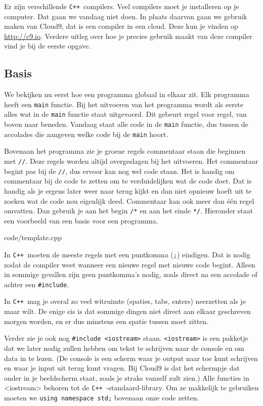 \documentclass[12pt,a4paper]{article}
\newcommand{\code}{}
\newcommand{\icode}{\lstinline}
\newcommand{\mono}{\texttt}
\newcommand{\cpp}{\mono{C++ }}
\begin{document}
Er zijn verschillende \cpp compilers. Veel compilers moet je installeren op je computer. Dat gaan we vandaag niet doen. In plaats daarvan gaan we gebruik maken van Cloud9, dat is een compiler in een cloud. Deze kun je vinden op \url{http://c9.io}. Verdere uitleg over hoe je precies gebruik maakt van deze compiler vind je bij de eerste opgave.

\subsection{Basis}
We bekijken nu eerst hoe een programma globaal in elkaar zit.  Elk programma heeft een \icode{main} functie. Bij het uitvoeren van het programma wordt als eerste alles wat in de \icode{main} functie staat uitgevoerd. Dit gebeurt regel voor regel, van boven naar beneden. Vandaag staat alle code in de \icode{main} functie, dus tussen de accolades die aangeven welke code bij de \icode{main} hoort.

Bovenaan het programma zie je groene regels commentaar staan die beginnen met \icode{//}. Deze regels worden altijd overgeslagen bij het uitvoeren. Het commentaar begint pas bij de \icode{//}, dus ervoor kan nog wel code staan. Het is handig om commentaar bij de code te zetten om te verduidelijken wat de code doet. Dat is handig als je ergens later weer naar terug kijkt en dan niet opnieuw hoeft uit te zoeken wat de code nou eigenlijk deed. Commentaar kan ook meer dan \'e\'en regel omvatten. Dan gebruik je aan het begin \icode{/*} en aan het einde \icode{*/}. Hieronder staat een voorbeeld van een basis voor een programma. 

\code{code/template.cpp}

In \cpp moeten de meeste regels met een puntkomma (\icode{;}) eindigen. Dat is nodig zodat de compiler weet wanneer een nieuwe regel met nieuwe code begint. Alleen in sommige gevallen zijn geen puntkomma's nodig, zoals direct na een accolade of achter een \icode{#include}.

In \cpp  mag je overal zo veel witruimte (spaties, tabs, enters) neerzetten als je maar wilt. De enige eis is dat sommige dingen niet direct aan elkaar geschreven morgen worden, en er dus minstens een spatie tussen moet zitten.

Verder zie je ook nog \icode{#include <iostream>} staan. \icode{<iostream>} is een pakketje dat we later nodig zullen hebben om tekst te schrijven naar de console en om data in te lezen.
(De console is een scherm waar je output naar toe kunt schrijven en waar je input uit terug kunt vragen. Bij Cloud9 is dat het schermpje dat onder in je beeldscherm staat, zoals je straks vanzelf zult zien.)
Alle functies in <iostream> behoren tot de \cpp-standaard-library. Om ze makkelijk te gebruiken moeten we \icode{using namespace std;} bovenaan onze code zetten.
\end{document}
